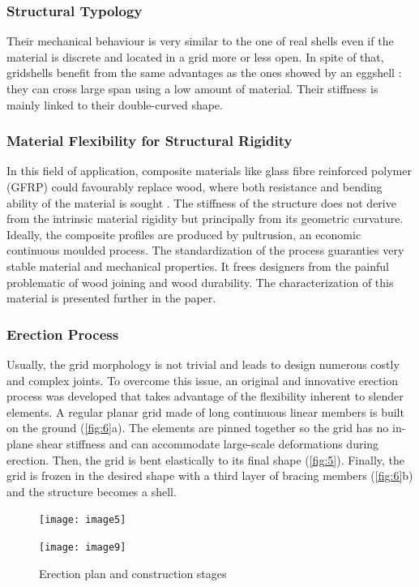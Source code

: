 \subsubsection{Structural Typology}
Their mechanical behaviour is very similar to the one of real shells even if the material is discrete and located in a grid more or less open. In spite of that, gridshells benefit from the same advantages as the ones showed by an eggshell : they can cross large span using a low amount of material. Their stiffness is mainly linked to their double-curved shape.


\subsubsection{Material Flexibility for Structural Rigidity}
In this field of application, composite materials like glass fibre reinforced polymer (GFRP) could favourably replace wood, where both resistance and bending ability of the material is sought \cite{Douthe2010}. The stiffness of the structure does not derive from the intrinsic material rigidity but principally from its geometric curvature. Ideally, the composite profiles are produced by pultrusion, an economic continuous moulded process. The standardization of the process guaranties very stable material and mechanical properties. It frees designers from the painful problematic of wood joining and wood durability. The characterization of this material is presented further in the paper.


\subsubsection{Erection Process}
Usually, the grid morphology is not trivial and leads to design numerous costly and complex joints. To overcome this issue, an original and innovative erection process was developed that takes advantage of the flexibility inherent to slender elements. A regular planar grid made of long continuous linear members is built on the ground (\autoref{fig:6}a). The elements are pinned together so the grid has no in-plane shear stiffness and can accommodate large-scale deformations during erection. Then, the grid is bent elastically to its final shape (\autoref{fig:5}). Finally, the grid is frozen in the desired shape with a third layer of bracing members (\autoref{fig:6}b) and the structure becomes a shell.
\begin{figure}[t]
	\begin{minipage}[b]{.70\linewidth}
		\centering\texttt{[image: image5]}
	\end{minipage} \hfill
	\begin{minipage}[b]{.25\linewidth}
		\centering\texttt{[image: image9]}	
	\end{minipage}
	\vspace{0.5cm}
	\caption{Erection plan and construction stages}\label{fig:6}
\end{figure}

%
%

